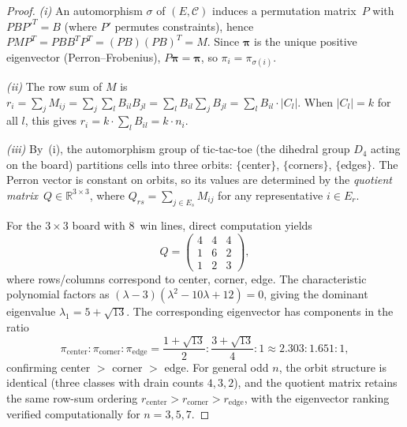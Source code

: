 \documentclass[11pt,a4paper]{article}
\newcommand{\R}{\mathbb{R}}
\begin{document}
\begin{proof}
\emph{(i)} An automorphism $\sigma$ of $(E, \mathcal{C})$ induces a permutation matrix~$P$ with $PBP'^T = B$ (where $P'$ permutes constraints), hence $PMP^T = PBB^T P^T = (PB)(PB)^T = M$.
Since $\boldsymbol{\pi}$ is the unique positive eigenvector (Perron--Frobenius), $P\boldsymbol{\pi} = \boldsymbol{\pi}$, so $\pi_i = \pi_{\sigma(i)}$.

\emph{(ii)} The row sum of $M$ is
$r_i = \sum_j M_{ij} = \sum_j \sum_l B_{il} B_{jl} = \sum_l B_{il} \sum_j B_{jl} = \sum_l B_{il} \cdot |C_l|$.
When $|C_l| = k$ for all $l$, this gives $r_i = k \cdot \sum_l B_{il} = k \cdot n_i$.

\emph{(iii)} By~(i), the automorphism group of tic-tac-toe (the dihedral group $D_4$ acting on the board) partitions cells into three orbits: $\{$center$\}$, $\{$corners$\}$, $\{$edges$\}$.
The Perron vector is constant on orbits, so its values are determined by the \emph{quotient matrix}~$Q \in \R^{3 \times 3}$, where $Q_{rs} = \sum_{j \in E_s} M_{ij}$ for any representative $i \in E_r$.

For the $3 \times 3$ board with 8~win lines, direct computation yields
\[
  Q = \begin{pmatrix} 4 & 4 & 4 \\ 1 & 6 & 2 \\ 1 & 2 & 3 \end{pmatrix},
\]
where rows/columns correspond to center, corner, edge.
The characteristic polynomial factors as $(\lambda - 3)(\lambda^2 - 10\lambda + 12) = 0$, giving the dominant eigenvalue $\lambda_1 = 5 + \sqrt{13}$.
The corresponding eigenvector has components in the ratio
\begin{equation}\label{eq:ev-ratio}
  \pi_{\mathrm{center}} : \pi_{\mathrm{corner}} : \pi_{\mathrm{edge}}
  = \frac{1 + \sqrt{13}}{2} : \frac{3 + \sqrt{13}}{4} : 1
  \approx 2.303 : 1.651 : 1,
\end{equation}
confirming center $>$ corner $>$ edge.
For general odd $n$, the orbit structure is identical (three classes with drain counts $4, 3, 2$), and the quotient matrix retains the same row-sum ordering $r_{\mathrm{center}} > r_{\mathrm{corner}} > r_{\mathrm{edge}}$, with the eigenvector ranking verified computationally for $n = 3, 5, 7$.
\end{proof}
\end{document}
